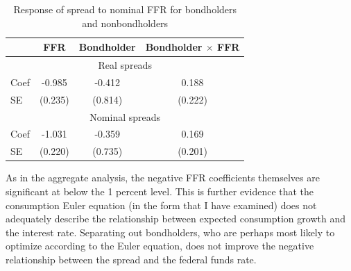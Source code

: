 \begin{table}[h]
\centering
\caption{Response of spread to nominal FFR for bondholders and nonbondholders}
\label{cex-spread-regression}
\begin{tabular}{lccc} \hline
& FFR & Bondholder & Bondholder $\times$ FFR \\ \hline
\multicolumn{4}{c}{Real spreads} \\ \hline
Coef & -0.985  & -0.412  & 0.188 \\
SE   & (0.235) & (0.814) & (0.222) \\ \hline
\multicolumn{4}{c}{Nominal spreads} \\ \hline
Coef & -1.031  & -0.359  & 0.169 \\
SE   & (0.220) & (0.735) & (0.201) \\ \hline
\end{tabular}
\end{table}

As in the aggregate analysis, the negative FFR coefficients themselves are significant at below the 1 percent level. This is further evidence that the consumption Euler equation (in the form that I have examined) does not adequately describe the relationship between expected consumption growth and the interest rate. Separating out bondholders, who are perhaps most likely to optimize according to the Euler equation, does not improve the negative relationship between the spread and the federal funds rate.